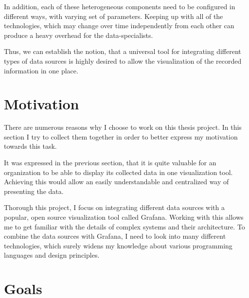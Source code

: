 In addition, each of these heterogeneous components need to be configured in different ways, with varying set of parameters. Keeping up with all of the technologies, which may change over time independently from each other  can produce a heavy overhead for the data-specialists.

Thus, we can establish the notion, that a universal tool for integrating different types of data sources is highly desired to allow the visualization of the recorded information in one place.

\section{Motivation}


There are numerous reasons why I choose to work on this thesis project. In this section I try to collect them together in order to better express my motivation towards this task.

It was expressed in the previous section, that it is quite valuable for an organization to be able to display its collected data in one visualization tool. Achieving this would allow an easily understandable and centralized way of presenting the data.

Thorough this project, I focus on integrating different data sources with a popular, open source visualization tool called Grafana. Working with this allows me to get familiar with the details of complex systems and their architecture. To combine the data sources with Grafana, I need to look into many different technologies, which surely widens my knowledge about various programming languages and design principles.

\section{Goals} \label{goals}

